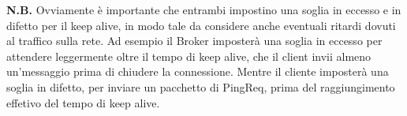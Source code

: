 \documentclass{article}
\begin{document}
\textbf{N.B.} Ovviamente è importante che entrambi impostino una soglia in eccesso e in difetto per il keep alive, in modo tale da considere anche eventuali ritardi dovuti al traffico sulla rete. Ad esempio il Broker imposterà una soglia in eccesso per attendere leggermente oltre il tempo di keep alive, che il client invii almeno un'messaggio prima di chiudere la connessione. Mentre il cliente imposterà una soglia in difetto, per inviare un pacchetto di PingReq, prima del raggiungimento effetivo del tempo di keep alive.
\end{document}
